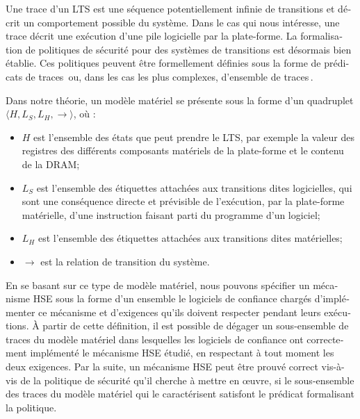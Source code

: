 \begin{otherlanguage}{french}
  Une trace d’un LTS est une séquence potentiellement infinie de transitions et
  décrit un comportement possible du système. Dans le cas qui nous intéresse,
  une trace décrit une exécution d’une pile logicielle par la plate-forme.
  La formalisation de politiques de sécurité pour des systèmes de transitions est
  désormais bien établie.
  Ces politiques peuvent être formellement définies sous la forme de prédicats de
  traces\,\cite{lamport1977proving,lamport1985logical,lamport1985logical,alpern1985liveness}
  ou, dans les cas les plus complexes, d’ensemble de
  traces\,\cite{clarkson2010hyperproperties}.

  Dans notre théorie, un modèle matériel se présente sous la
  forme d’un quadruplet \( \langle H, L_S, L_H, \rightarrow \rangle \), où :
  \begin{itemize}
  \item \( H \) est l’ensemble des états que peut prendre le LTS, par exemple la
    valeur des registres des différents composants matériels de la plate-forme
    et le contenu de la DRAM;
  \item \( L_S \) est l’ensemble des étiquettes attachées aux transitions dites
    logicielles, qui sont une conséquence directe et prévisible de l’exécution,
    par la plate-forme matérielle, d’une instruction faisant parti du programme
    d’un logiciel;
  \item \( L_H \) est l’ensemble des étiquettes attachées aux transitions dites
    matérielles;
  \item \( \rightarrow \) est la relation de transition du système.
  \end{itemize}

  En se basant sur ce type de modèle matériel, nous pouvons spécifier un
  mécanisme HSE sous la forme d’un ensemble le logiciels de confiance chargés
  d’implémenter ce mécanisme et d’exigences qu’ils doivent respecter pendant
  leurs exécutions.
  À partir de cette définition, il est possible de dégager un sous-ensemble de
  traces du modèle matériel dans lesquelles les logiciels de confiance ont
  correctement implémenté le mécanisme HSE étudié, en respectant à tout moment
  les deux exigences.
  Par la suite, un mécanisme HSE peut être prouvé correct vis-à-vis de
  la politique de sécurité qu’il cherche à mettre en œuvre, si le sous-ensemble
  des traces du modèle matériel qui le caractérisent satisfont le prédicat
  formalisant la politique.


\end{otherlanguage}
